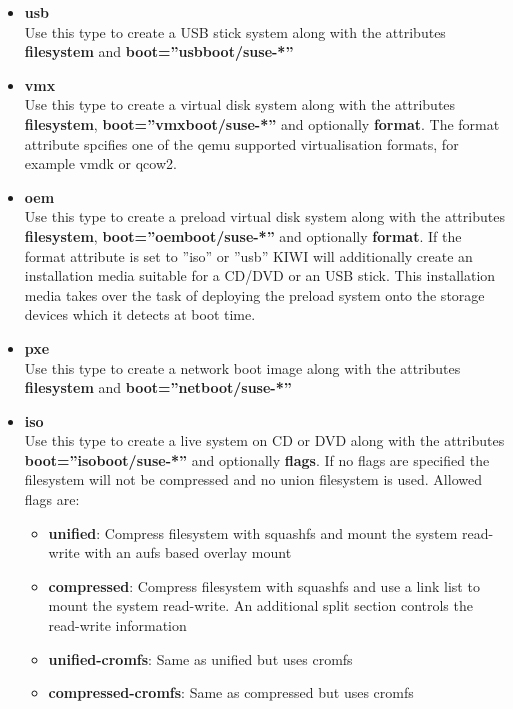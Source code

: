 \begin{itemize}
\item \textbf{usb}\\
      Use this type to create a USB stick system along with the
      attributes \textbf{filesystem} and \textbf{boot=''usbboot/suse-*''}
\item \textbf{vmx}\\
      Use this type to create a virtual disk system along with the
      attributes \textbf{filesystem}, \textbf{boot=''vmxboot/suse-*''} and
      optionally \textbf{format}. The format attribute spcifies one of
      the qemu supported virtualisation formats, for example vmdk or qcow2.
\item \textbf{oem}\\
      Use this type to create a preload virtual disk system along with
      the attributes \textbf{filesystem}, \textbf{boot=''oemboot/suse-*''} and
      optionally \textbf{format}. If the format attribute is set to
      ''iso'' or ''usb'' KIWI will additionally create an installation
      media suitable for a CD/DVD or an USB stick. This installation media
      takes over the task of deploying the preload system onto the
      storage devices which it detects at boot time.
\item \textbf{pxe}\\
      Use this type to create a network boot image along with the
      attributes \textbf{filesystem} and \textbf{boot=''netboot/suse-*''}
\item \textbf{iso}\\
      Use this type to create a live system on CD or DVD along with
      the attributes \textbf{boot=''isoboot/suse-*''} and optionally
      \textbf{flags}. If no flags are specified the filesystem will not
      be compressed and no union filesystem is used. Allowed flags are:
      \begin{itemize}
      \item \textbf{unified}: Compress filesystem with squashfs and
            mount the system read-write with an aufs based overlay mount
      \item \textbf{compressed}: Compress filesystem with squashfs and
            use a link list to mount the system read-write. An additional
            split section controls the read-write information 
      \item \textbf{unified-cromfs}: Same as unified but uses cromfs
      \item \textbf{compressed-cromfs}: Same as compressed but uses cromfs

\end{itemize}
\end{itemize}

